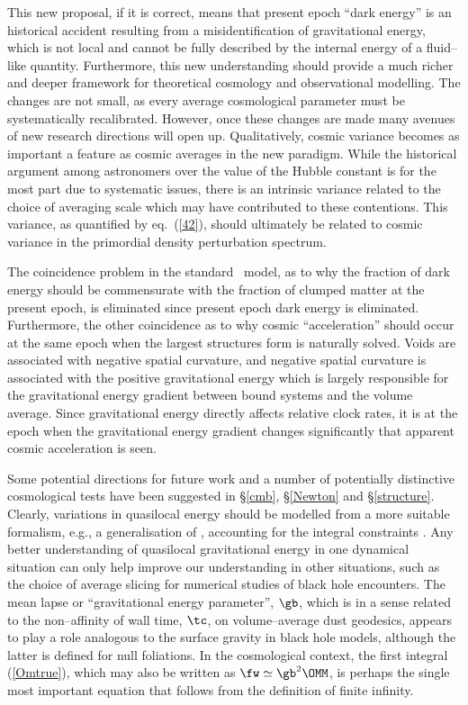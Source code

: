 \documentclass[12pt]{iopart}
\begin{document}
This new proposal, if it is correct, means that present epoch ``dark energy''
is an historical accident resulting from a misidentification of gravitational
energy, which is not local and cannot be fully described by the
internal energy of a fluid--like quantity.
Furthermore, this new understanding should provide
a much richer and deeper framework for theoretical cosmology and observational
modelling. The changes are not small, as every average cosmological parameter
must be systematically recalibrated. However, once these changes are made
many avenues of new research directions will open up. Qualitatively,
cosmic variance becomes as important a feature as cosmic averages in the new
paradigm. While the historical argument among astronomers over the value of
the Hubble constant is for the most part due to systematic issues, there
is an intrinsic variance related to the choice of averaging scale which may
have contributed to these contentions. This variance, as quantified by
eq.\ (\ref{42}), should ultimately be related to cosmic variance in the
primordial density perturbation spectrum.

The coincidence problem in the standard \LCDM\ model, as to why the fraction
of dark energy should be commensurate with the fraction of clumped
matter at the present epoch, is eliminated since present epoch dark energy
is eliminated. Furthermore, the other coincidence as to why cosmic
``acceleration'' should occur at the same epoch when the largest structures
form is naturally solved. Voids are associated with negative spatial
curvature, and negative spatial curvature is associated with the positive
gravitational energy which is largely responsible for the gravitational
energy gradient between bound systems and the volume average. Since
gravitational energy directly affects relative clock rates, it is at the
epoch when the gravitational energy gradient changes significantly that
apparent cosmic acceleration is seen.

Some potential directions for future work and a number of potentially
distinctive cosmological tests have been suggested in \S\ref{cmb},
\S\ref{Newton} and \S\ref{structure}. Clearly, variations in quasilocal energy
should be modelled from a more suitable formalism, e.g., a generalisation of
\cite{KLB,quasi1,quasi2}, accounting for the integral constraints
\cite{Traschen1,Mach1,Traschen2}.
Any better understanding of quasilocal gravitational energy in one dynamical
situation can only help improve our understanding in other situations,
such as the choice of average slicing for numerical studies of black hole
encounters. The mean lapse or ``gravitational energy parameter'', $\gb$,
which is in a sense related to the non--affinity of wall time, $\tc$, on
volume--average dust geodesics, appears to play a role analogous to the
surface gravity in black hole models, although the latter is
defined for null foliations. In the cosmological context, the first integral
(\ref{Omtrue}), which may also be written as $\fw\simeq\gb^2\OMM$, is perhaps
the single most important equation that follows from the definition of finite
infinity.
\end{document}
